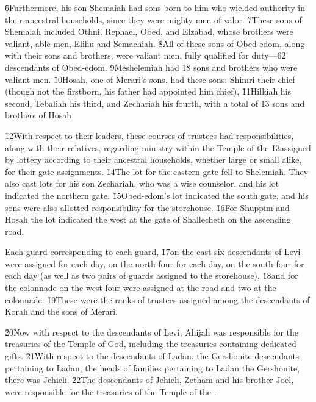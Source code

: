 \v{6}Furthermore, his son Shemaiah had sons born to him who wielded authority in their ancestral households, since they were mighty men of valor. \v{7}These sons of Shemaiah included Othni, Rephael, Obed, and Elzabad, whose brothers were valiant, able men, Elihu and Semachiah. \v{8}All of these sons of Obed-edom, along with their sons and brothers, were valiant men, fully qualified for duty---62 descendants of Obed-edom. \v{9}Meshelemiah had 18 sons and brothers who were valiant men. \v{10}Hosah, one of Merari's sons, had these sons: Shimri their chief (though not the firstborn, his father had appointed him chief), \v{11}Hilkiah his second, Tebaliah his third, and Zechariah his fourth, with a total of 13 sons and brothers of Hosah

\v{12}With respect to their leaders, these courses of trustees had responsibilities, along with their relatives, regarding ministry within the Temple of the  \v{13}assigned by lottery according to their ancestral households, whether large or small alike, for their gate assignments. \v{14}The lot for the eastern gate fell to Shelemiah. They also cast lots for his son Zechariah, who was a wise counselor, and his lot indicated the northern gate. \v{15}Obed-edom's lot indicated the south gate, and his sons were also allotted responsibility for the storehouse. \v{16}For Shuppim and Hosah the lot indicated the west at the gate of Shallecheth on the ascending road.

Each guard corresponding to each guard, \v{17}on the east six descendants of Levi were assigned for each day, on the north four for each day, on the south four for each day (as well as two pairs of guards assigned to the storehouse), \v{18}and for the colonnade on the west four were assigned at the road and two at the colonnade. \v{19}These were the ranks of trustees assigned among the descendants of Korah and the sons of Merari.

\v{20}Now with respect to the descendants of Levi, Ahijah was responsible for the treasuries of the Temple of God, including the treasuries containing dedicated gifts. \v{21}With respect to the descendants of Ladan, the Gershonite descendants pertaining to Ladan, the heads of families pertaining to Ladan the Gershonite, there was Jehieli. \v{22}The descendants of Jehieli, Zetham and his brother Joel, were responsible for the treasuries of the Temple of the .


